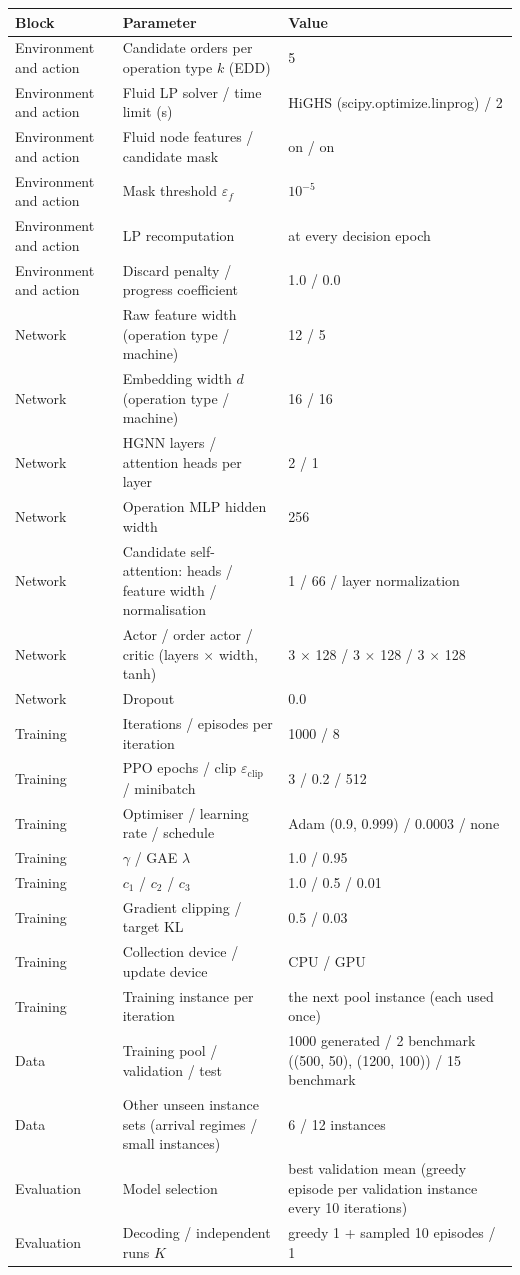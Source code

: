 \begin{tabular}{lll}
\toprule
Block & Parameter & Value \\
\midrule
Environment and action & Candidate orders per operation type $k$ (EDD) & 5 \\
Environment and action & Fluid LP solver / time limit (s) & HiGHS (scipy.optimize.linprog) / 2 \\
Environment and action & Fluid node features / candidate mask & on / on \\
Environment and action & Mask threshold $\varepsilon_f$ & $10^{-5}$ \\
Environment and action & LP recomputation & at every decision epoch \\
Environment and action & Discard penalty / progress coefficient & 1.0 / 0.0 \\
Network & Raw feature width (operation type / machine) & 12 / 5 \\
Network & Embedding width $d$ (operation type / machine) & 16 / 16 \\
Network & HGNN layers / attention heads per layer & 2 / 1 \\
Network & Operation MLP hidden width & 256 \\
Network & Candidate self-attention: heads / feature width / normalisation & 1 / 66 / layer normalization \\
Network & Actor / order actor / critic (layers $\times$ width, tanh) & 3 $\times$ 128 / 3 $\times$ 128 / 3 $\times$ 128 \\
Network & Dropout & 0.0 \\
Training & Iterations / episodes per iteration & 1000 / 8 \\
Training & PPO epochs / clip $\varepsilon_{\mathrm{clip}}$ / minibatch & 3 / 0.2 / 512 \\
Training & Optimiser / learning rate / schedule & Adam (0.9, 0.999) / 0.0003 / none \\
Training & $\gamma$ / GAE $\lambda$ & 1.0 / 0.95 \\
Training & $c_1$ / $c_2$ / $c_3$ & 1.0 / 0.5 / 0.01 \\
Training & Gradient clipping / target KL & 0.5 / 0.03 \\
Training & Collection device / update device & CPU / GPU \\
Training & Training instance per iteration & the next pool instance (each used once) \\
Data & Training pool / validation / test & 1000 generated / 2 benchmark ((500, 50), (1200, 100)) / 15 benchmark \\
Data & Other unseen instance sets (arrival regimes / small instances) & 6 / 12 instances \\
Evaluation & Model selection & best validation mean (greedy episode per validation instance every 10 iterations) \\
Evaluation & Decoding / independent runs $K$ & greedy 1 + sampled 10 episodes / 1 \\
\bottomrule
\end{tabular}
